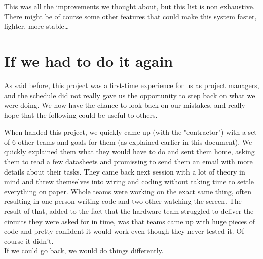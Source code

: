 \documentclass[12pt]{article}
\begin{document}
	This was all the improvements we thought about, but this list is non exhaustive. There might be of course some other features that could make this system faster, lighter, more stable…\\


\newpage
\section{If we had to do it again}
	As said before, this project was a first-time experience for us as project managers, and the schedule did not really gave us the opportunity to step back on what we were doing. We now have the chance to look back on our mistakes, and really hope that the following could be useful to others.

	When handed this project, we quickly came up (with the "contractor") with a set of 6 other teams and goals for them (as explained earlier in this document). We quickly explained them what they would have to do and sent them home, asking them to read a few datasheets and promissing to send them an email with more details about their tasks. They came back next session with a lot of theory in mind and threw themselves into wiring and coding without taking time to settle everything on paper. Whole teams were working on the exact same thing, often resulting in one person writing code and two other watching the screen. The result of that, added to the fact that the hardware team struggled to deliver the circuits they were asked for in time, was that teams came up with huge pieces of code and pretty confident it would work even though they never tested it. Of course it didn't.\\

	If we could go back, we would do things differently.\\
\end{document}
